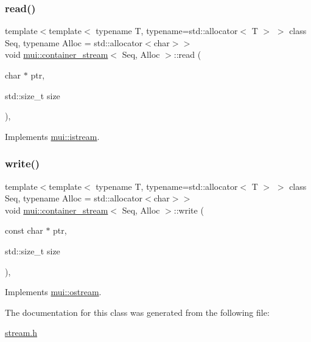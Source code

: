 \subsubsection{\texorpdfstring{read()}{read()}}
{\footnotesize\ttfamily template$<$template$<$ typename T, typename=std\+::allocator$<$ T $>$ $>$ class Seq, typename Alloc  = std\+::allocator$<$char$>$$>$ \\
void \hyperlink{classmui_1_1container__stream}{mui\+::container\+\_\+stream}$<$ Seq, Alloc $>$\+::read (\begin{DoxyParamCaption}\item[{char $\ast$}]{ptr,  }\item[{std\+::size\+\_\+t}]{size }\end{DoxyParamCaption})\hspace{0.3cm}{\ttfamily [inline]}, {\ttfamily [virtual]}}



Implements \hyperlink{classmui_1_1istream_a275ecbe530bf67df5978be288897ab45}{mui\+::istream}.

\mbox{\label{classmui_1_1container__stream_a47bb31cd5e33311702d15e43f87cdc92}} 
\subsubsection{\texorpdfstring{write()}{write()}}
{\footnotesize\ttfamily template$<$template$<$ typename T, typename=std\+::allocator$<$ T $>$ $>$ class Seq, typename Alloc  = std\+::allocator$<$char$>$$>$ \\
void \hyperlink{classmui_1_1container__stream}{mui\+::container\+\_\+stream}$<$ Seq, Alloc $>$\+::write (\begin{DoxyParamCaption}\item[{const char $\ast$}]{ptr,  }\item[{std\+::size\+\_\+t}]{size }\end{DoxyParamCaption})\hspace{0.3cm}{\ttfamily [inline]}, {\ttfamily [virtual]}}



Implements \hyperlink{classmui_1_1ostream_a93a0a1d32007efc375d885181c833995}{mui\+::ostream}.



The documentation for this class was generated from the following file\+:\begin{DoxyCompactItemize}
\item 
\hyperlink{stream_8h}{stream.\+h}\end{DoxyCompactItemize}
